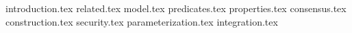{introduction.tex}
{related.tex}
{model.tex}
{predicates.tex}
{properties.tex}
{consensus.tex}
{construction.tex}
{security.tex}
{parameterization.tex}
{integration.tex}

